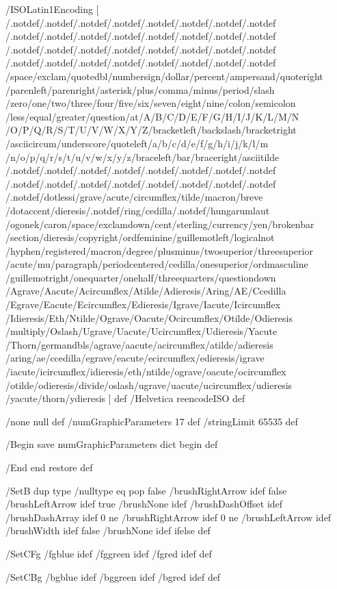 /ISOLatin1Encoding [
/.notdef/.notdef/.notdef/.notdef/.notdef/.notdef/.notdef/.notdef
/.notdef/.notdef/.notdef/.notdef/.notdef/.notdef/.notdef/.notdef
/.notdef/.notdef/.notdef/.notdef/.notdef/.notdef/.notdef/.notdef
/.notdef/.notdef/.notdef/.notdef/.notdef/.notdef/.notdef/.notdef
/space/exclam/quotedbl/numbersign/dollar/percent/ampersand/quoteright
/parenleft/parenright/asterisk/plus/comma/minus/period/slash
/zero/one/two/three/four/five/six/seven/eight/nine/colon/semicolon
/less/equal/greater/question/at/A/B/C/D/E/F/G/H/I/J/K/L/M/N
/O/P/Q/R/S/T/U/V/W/X/Y/Z/bracketleft/backslash/bracketright
/asciicircum/underscore/quoteleft/a/b/c/d/e/f/g/h/i/j/k/l/m
/n/o/p/q/r/s/t/u/v/w/x/y/z/braceleft/bar/braceright/asciitilde
/.notdef/.notdef/.notdef/.notdef/.notdef/.notdef/.notdef/.notdef
/.notdef/.notdef/.notdef/.notdef/.notdef/.notdef/.notdef/.notdef
/.notdef/dotlessi/grave/acute/circumflex/tilde/macron/breve
/dotaccent/dieresis/.notdef/ring/cedilla/.notdef/hungarumlaut
/ogonek/caron/space/exclamdown/cent/sterling/currency/yen/brokenbar
/section/dieresis/copyright/ordfeminine/guillemotleft/logicalnot
/hyphen/registered/macron/degree/plusminus/twosuperior/threesuperior
/acute/mu/paragraph/periodcentered/cedilla/onesuperior/ordmasculine
/guillemotright/onequarter/onehalf/threequarters/questiondown
/Agrave/Aacute/Acircumflex/Atilde/Adieresis/Aring/AE/Ccedilla
/Egrave/Eacute/Ecircumflex/Edieresis/Igrave/Iacute/Icircumflex
/Idieresis/Eth/Ntilde/Ograve/Oacute/Ocircumflex/Otilde/Odieresis
/multiply/Oslash/Ugrave/Uacute/Ucircumflex/Udieresis/Yacute
/Thorn/germandbls/agrave/aacute/acircumflex/atilde/adieresis
/aring/ae/ccedilla/egrave/eacute/ecircumflex/edieresis/igrave
/iacute/icircumflex/idieresis/eth/ntilde/ograve/oacute/ocircumflex
/otilde/odieresis/divide/oslash/ugrave/uacute/ucircumflex/udieresis
/yacute/thorn/ydieresis
] def
/Helvetica reencodeISO def

/none null def
/numGraphicParameters 17 def
/stringLimit 65535 def

/Begin {
save
numGraphicParameters dict begin
} def

/End {
end
restore
} def

/SetB {
dup type /nulltype eq {
pop
false /brushRightArrow idef
false /brushLeftArrow idef
true /brushNone idef
} {
/brushDashOffset idef
/brushDashArray idef
0 ne /brushRightArrow idef
0 ne /brushLeftArrow idef
/brushWidth idef
false /brushNone idef
} ifelse
} def

/SetCFg {
/fgblue idef
/fggreen idef
/fgred idef
} def

/SetCBg {
/bgblue idef
/bggreen idef
/bgred idef
} def

